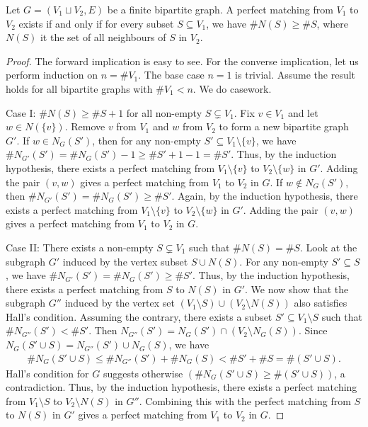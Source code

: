 \begin{theorem}
    Let $G = (V_{1} \sqcup V_{2}, E)$ be a finite bipartite graph. A perfect matching from $V_{1}$ to $V_{2}$ exists if and only if for every subset $S \subseteq V_{1}$, we have $\# N(S) \geq \#S$, where $N(S)$ it the set of all neighbours of $S$ in $V_{2}$.
\end{theorem}
\begin{proof}
    The forward implication is easy to see. For the converse implication, let us perform induction on $n = \#V_{1}$. The base case $n = 1$ is trivial. Assume the result holds for all bipartite graphs with $\#V_{1} < n$. We do casework.
    
    Case I: $\#N(S) \geq \#S + 1$ for all non-empty $S \subsetneq V_{1}$. Fix $v \in V_{1}$ and let $w \in N(\{v\})$. Remove $v$ from $V_{1}$ and $w$ from $V_{2}$ to form a new bipartite graph $G'$. If $w \in N_{G}(S')$, then for any non-empty $S' \subseteq V_{1} \setminus \{v\}$, we have $\#N_{G'}(S') = \#N_{G}(S') - 1 \geq \#S' + 1 - 1 = \#S'$. Thus, by the induction hypothesis, there exists a perfect matching from $V_{1} \setminus \{v\}$ to $V_{2} \setminus \{w\}$ in $G'$. Adding the pair $(v,w)$ gives a perfect matching from $V_{1}$ to $V_{2}$ in $G$. If $w \notin N_{G}(S')$, then $\#N_{G'}(S') = \#N_{G}(S') \geq \#S'$. Again, by the induction hypothesis, there exists a perfect matching from $V_{1} \setminus \{v\}$ to $V_{2} \setminus \{w\}$ in $G'$. Adding the pair $(v,w)$ gives a perfect matching from $V_{1}$ to $V_{2}$ in $G$.

    Case II: There exists a non-empty $S \subsetneq V_{1}$ such that $\#N(S) = \#S$. Look at the subgraph $G'$ induced by the vertex subset $S \cup N(S)$. For any non-empty $S' \subseteq S$, we have $\#N_{G'}(S') = \#N_{G}(S') \geq \#S'$. Thus, by the induction hypothesis, there exists a perfect matching from $S$ to $N(S)$ in $G'$. We now show that the subgraph $G''$ induced by the vertex set $(V_{1}\setminus S) \cup (V_{2} \setminus N(S))$ also satisfies Hall's condition. Assuming the contrary, there exists a subset $S' \subseteq V_{1} \setminus S$ such that $\#N_{G''}(S') < \#S'$. Then $N_{G''}(S') = N_{G}(S') \cap (V_{2}\setminus N_{G}(S))$. Since $N_{G}(S' \cup S) = N_{G''}(S') \cup N_{G}(S)$, we have
    \begin{align}
        \# N_{G}(S' \cup S) \leq \#N_{G''}(S') + \#N_{G}(S) < \#S' + \#S = \#(S' \cup S).
    \end{align}
    Hall's condition for $G$ suggests otherwise $(\#N_{G}(S' \cup S) \geq \#(S' \cup S))$, a contradiction. Thus, by the induction hypothesis, there exists a perfect matching from $V_{1} \setminus S$ to $V_{2} \setminus N(S)$ in $G''$. Combining this with the perfect matching from $S$ to $N(S)$ in $G'$ gives a perfect matching from $V_{1}$ to $V_{2}$ in $G$.
\end{proof}

